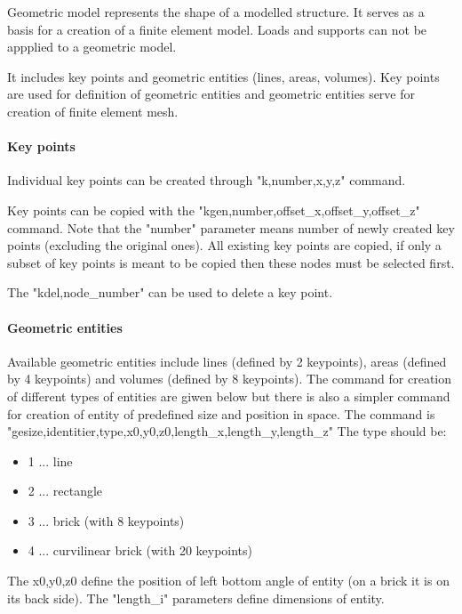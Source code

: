 \documentclass{article}
\begin{document}
 Geometric model represents the shape of a modelled
 structure. It serves as a basis for a creation
 of a finite element model. Loads and supports can not
 be appplied to a geometric model.

 It includes key points and geometric entities (lines,
 areas, volumes). Key points are used for definition of
 geometric entities and geometric entities serve for
 creation of finite element mesh.



\paragraph{Key points}

 Individual key points can be created through "k,number,x,y,z"
 command.

 Key points can be copied with the "kgen,number,offset\_x,offset\_y,offset\_z" command.
 Note that the "number" parameter means number of newly created
 key points (excluding the original ones). All existing key points
 are copied, if only a subset of key points is meant to be copied
 then these nodes must be selected first.

 The "kdel,node\_number" can be used to delete a key point.



\paragraph{Geometric entities}

 Available geometric entities include lines (defined by 2 keypoints), areas
 (defined by 4 keypoints) and volumes (defined by 8 keypoints).
 The command for creation of different types of entities are giwen below
 but there is also a simpler command for creation of entity of predefined
 size and position in space.
 The command is "gesize,identitier,type,x0,y0,z0,length\_x,length\_y,length\_z"
 The type should be:


\begin{itemize}
\item  1 ... line
\item  2 ... rectangle
\item  3 ... brick (with 8 keypoints)
\item  4 ... curvilinear brick (with 20 keypoints)
\end{itemize}

 The x0,y0,z0 define the position of left bottom angle of entity (on a brick
 it is on its back side).
 The "length\_i" parameters define dimensions of entity.
\end{document}
